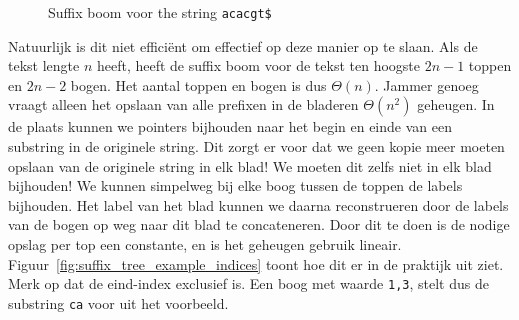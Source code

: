 \begin{figure}[H]
    \center
    \caption{Suffix boom voor the string \texttt{acacgt\$}}\label{fig:suffix_tree_example}

\end{figure}

Natuurlijk is dit niet efficiënt om effectief op deze manier op te slaan.
Als de tekst lengte $n$ heeft, heeft de suffix boom voor de tekst ten hoogste $2n - 1$ toppen en $2n - 2$ bogen.
Het aantal toppen en bogen is dus $\Theta(n)$.
Jammer genoeg vraagt alleen het opslaan van alle prefixen in de bladeren $\Theta(n^2)$ geheugen\cite{AD3_ukkonen}.
In de plaats kunnen we pointers bijhouden naar het begin en einde van een substring in de originele string.
Dit zorgt er voor dat we geen kopie meer moeten opslaan van de originele string in elk blad!
We moeten dit zelfs niet in elk blad bijhouden!
We kunnen simpelweg bij elke boog tussen de toppen de labels bijhouden.
Het label van het blad kunnen we daarna reconstrueren door de labels van de bogen op weg naar dit blad te concateneren.
Door dit te doen is de nodige opslag per top een constante, en is het geheugen gebruik lineair.
Figuur~\ref{fig:suffix_tree_example_indices} toont hoe dit er in de praktijk uit ziet.
Merk op dat de eind-index exclusief is.
Een boog met waarde \texttt{1,3}, stelt dus de substring \texttt{ca} voor uit het voorbeeld.


